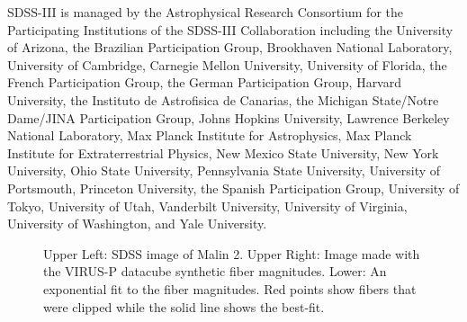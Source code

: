 \documentclass{emulateapj}
\begin{document}
SDSS-III is managed by the Astrophysical Research Consortium for the Participating Institutions of the SDSS-III Collaboration including the University of Arizona, the Brazilian Participation Group, Brookhaven National Laboratory, University of Cambridge, Carnegie Mellon University, University of Florida, the French Participation Group, the German Participation Group, Harvard University, the Instituto de Astrofisica de Canarias, the Michigan State/Notre Dame/JINA Participation Group, Johns Hopkins University, Lawrence Berkeley National Laboratory, Max Planck Institute for Astrophysics, Max Planck Institute for Extraterrestrial Physics, New Mexico State University, New York University, Ohio State University, Pennsylvania State University, University of Portsmouth, Princeton University, the Spanish Participation Group, University of Tokyo, University of Utah, Vanderbilt University, University of Virginia, University of Washington, and Yale University.



%
%





\begin{figure}
\caption{Upper Left:  SDSS image of Malin 2.  Upper Right:  Image made with the VIRUS-P datacube synthetic fiber magnitudes.  Lower:  An exponential fit to the fiber magnitudes.  Red points show fibers that were clipped while the solid line shows the best-fit.  \label{Malin2_fibers} }
\end{figure}









\end{document}
